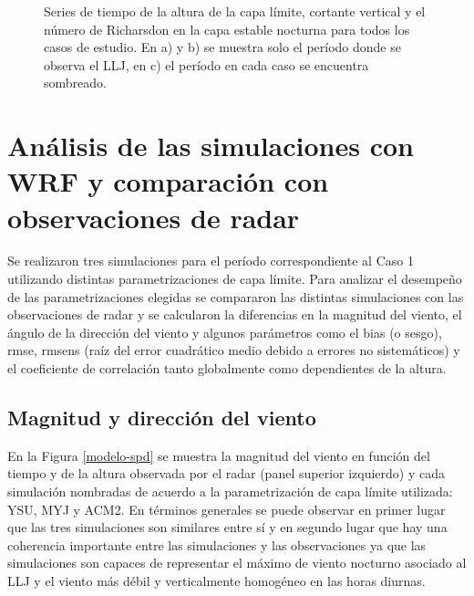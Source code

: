 \documentclass[12pt,spanish,oneside, a4paper]{book}
\begin{document}
\begin{figure}
\newline{}\newline{}\caption{Series de tiempo de la altura de la capa límite, cortante vertical y el número de Richarsdon en la capa estable nocturna para todos los casos de estudio. En a) y b) se muestra solo el período donde se observa el LLJ, en c) el período en cada caso se encuentra sombreado. \label{estable-vad}}\label{fig:estable-vad}
\end{figure}

\section{Análisis de las simulaciones con WRF y comparación con
observaciones de
radar}\label{analisis-de-las-simulaciones-con-wrf-y-comparacion-con-observaciones-de-radar}

Se realizaron tres simulaciones para el período correspondiente al Caso
1 utilizando distintas parametrizaciones de capa límite. Para analizar
el desempeño de las parametrizaciones elegidas se compararon las
distintas simulaciones con las observaciones de radar y se calcularon la
diferencias en la magnitud del viento, el ángulo de la dirección del
viento y algunos parámetros como el bias (o sesgo), rmse, rmsens (raíz
del error cuadrático medio debido a errores no sistemáticos) y el
coeficiente de correlación tanto globalmente como dependientes de la
altura.

\subsection{Magnitud y dirección del
viento}\label{magnitud-y-direccion-del-viento}

En la Figura \ref{modelo-spd} se muestra la magnitud del viento en
función del tiempo y de la altura observada por el radar (panel superior
izquierdo) y cada simulación nombradas de acuerdo a la parametrización
de capa límite utilizada: YSU, MYJ y ACM2. En términos generales se
puede observar en primer lugar que las tres simulaciones son similares
entre sí y en segundo lugar que hay una coherencia importante entre las
simulaciones y las observaciones ya que las simulaciones son capaces de
representar el máximo de viento nocturno asociado al LLJ y el viento más
débil y verticalmente homogéneo en las horas diurnas.
\end{document}

